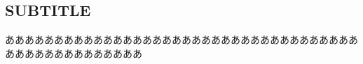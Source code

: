 \makeatletter %
\subsection{SUBTITLE}
ああああああああああああああああああああああああああああああああああああああああああああああああああ\cite{tmpRef}